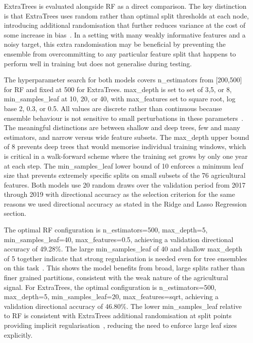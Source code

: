 \documentclass[pdflatex,sn-mathphys-num, oneside]{sn-jnl}%
\theoremstyle{thmstyleone}%
\theoremstyle{thmstyletwo}%
\theoremstyle{thmstylethree}%
\begin{document}
ExtraTrees is evaluated alongside RF as a direct comparison. The key distinction is that ExtraTrees uses random rather than optimal split thresholds at each node, introducing additional randomisation that further reduces variance at the cost of some increase in bias~\cite{bib25}. In a setting with many weakly informative features and a noisy target, this extra randomisation may be beneficial by preventing the ensemble from overcommitting to any particular feature split that happens to perform well in training but does not generalise during testing. 

The hyperparameter search for both models covers n\_estimators from [200,500] for RF and fixed at 500 for ExtraTrees. max\_depth is set to set of 3,5, or 8, min\_samples\_leaf at 10, 20, or 40, with max\_features set to square root, log base 2, 0.3, or 0.5. All values are discrete rather than continuous because ensemble behaviour is not sensitive to small perturbations in these parameters~\cite{bib28}. The meaningful distinctions are between shallow and deep trees, few and many estimators, and narrow versus wide feature subsets. The max\_depth upper bound of 8 prevents deep trees that would memorise individual training windows, which is critical in a walk-forward scheme where the training set grows by only one year at each step. The min\_samples\_leaf lower bound of 10 enforces a minimum leaf size that prevents extremely specific splits on small subsets of the 76 agricultural features. Both models use 20 random draws over the validation period from 2017 through 2019 with directional accuracy as the selection criterion for the same reasons we used directional accuracy as stated in the Ridge and Lasso Regression section.

The optimal RF configuration is n\_estimators=500, max\_depth=5, min\_samples\_leaf=40, max\_features=0.5, achieving a validation directional accuracy of 49.28\%. The large min\_samples\_leaf of 40 and shallow max\_depth of 5 together indicate that strong regularisation is needed even for tree ensembles on this task~\cite{bib28,bib29}. This shows the model benefits from broad, large splits rather than finer grained partitions, consistent with the weak nature of the agricultural signal. For ExtraTrees, the optimal configuration is n\_estimators=500, max\_depth=5, min\_samples\_leaf=20, max\_features=sqrt, achieving a validation directional accuracy of 46.80\%. The lower min\_samples\_leaf relative to RF is consistent with ExtraTrees additional randomisation at split points providing implicit regularisation~\cite{bib25}, reducing the need to enforce large leaf sizes explicitly.
\end{document}
